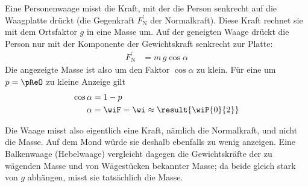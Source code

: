 \begin{center}
\end{center}

Eine Personenwaage misst die Kraft, mit der die Person senkrecht auf die Waagplatte drückt (die Gegenkraft $F_\mathrm{N}^\prime$ der Normalkraft). Diese Kraft rechnet sie mit dem Ortsfaktor $g$ in eine Masse um. Auf der geneigten Waage drückt die Person nur mit der Komponente der Gewichtskraft senkrecht zur Platte:
\begin{align}
 F_\mathrm{N}^\prime &= m\,g\cos\alpha
\end{align}
Die angezeigte Masse ist also um den Faktor $\cos\alpha$ zu klein. Für eine um $p = \pReO$ zu kleine Anzeige gilt
\begin{align}
 \cos\alpha &= 1-p \\
 \alpha &= \wiF = \wi \approx \result{\wiP{0}{2}}
\end{align}

Die Waage misst also eigentlich eine Kraft, nämlich die Normalkraft, und nicht die Masse. Auf dem Mond würde sie deshalb ebenfalls zu wenig anzeigen. Eine Balkenwaage (Hebelwaage) vergleicht dagegen die Gewichtskräfte der zu wägenden Masse und von Wägestücken bekannter Masse; da beide gleich stark von $g$ abhängen, misst sie tatsächlich die Masse.

